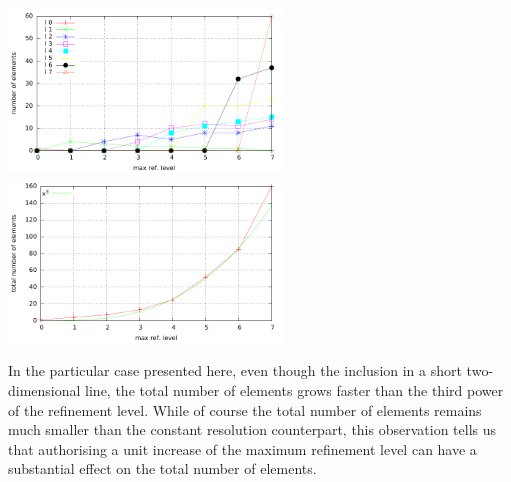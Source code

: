 \includegraphics[width=7.28cm]{images/meshes/AMR/amr_data1.pdf}
\includegraphics[width=7.28cm]{images/meshes/AMR/amr_data2.pdf}

In the particular case presented here, even though the inclusion in a short 
two-dimensional line, the total number of elements grows faster than the 
third power of the refinement level. While of course the total number 
of elements remains much smaller than the constant resolution counterpart, 
this observation tells us that authorising a unit increase of the maximum 
refinement level can have a substantial effect on the total number of elements.

\newpage

